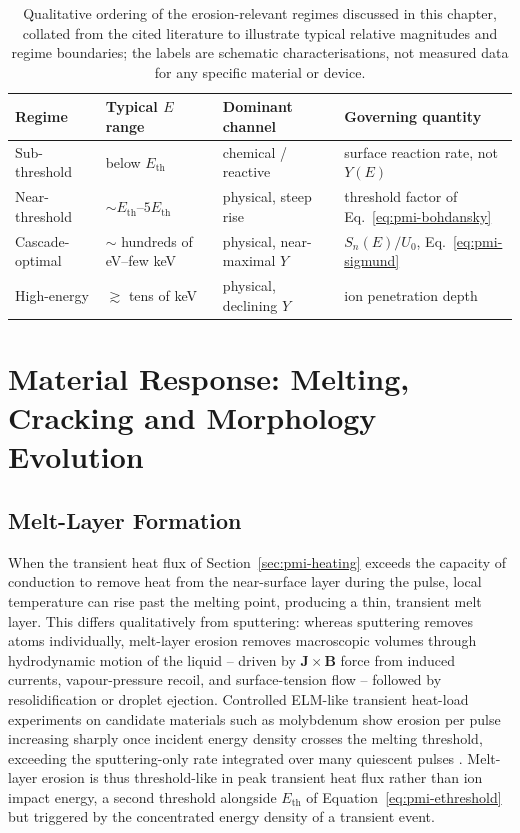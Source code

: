 \begin{table}[htbp]
\centering
\caption{Qualitative ordering of the erosion-relevant regimes discussed in this chapter, collated from the cited literature to illustrate typical relative magnitudes and regime boundaries; the labels are schematic characterisations, not measured data for any specific material or device.}
\label{tab:pmi-regimes}
\begin{tabularx}{\linewidth}{@{}l l l X@{}}
\toprule
Regime & Typical $E$ range & Dominant channel & Governing quantity \\
\midrule
Sub-threshold & below $E_{\mathrm{th}}$ & chemical / reactive & surface reaction rate, not $Y(E)$ \\
Near-threshold & $\sim E_{\mathrm{th}}$--$5E_{\mathrm{th}}$ & physical, steep rise & threshold factor of Eq.~\eqref{eq:pmi-bohdansky} \\
Cascade-optimal & $\sim$ hundreds of eV--few keV & physical, near-maximal $Y$ & $S_n(E)/U_0$, Eq.~\eqref{eq:pmi-sigmund} \\
High-energy & $\gtrsim$ tens of keV & physical, declining $Y$ & ion penetration depth \\
\bottomrule
\end{tabularx}
\end{table}

\section{Material Response: Melting, Cracking and Morphology Evolution}
\label{sec:pmi-material-response}

\subsection{Melt-Layer Formation}

When the transient heat flux of Section~\ref{sec:pmi-heating} exceeds the capacity of conduction to remove heat from the near-surface layer during the pulse, local temperature can rise past the melting point, producing a thin, transient melt layer. This differs qualitatively from sputtering: whereas sputtering removes atoms individually, melt-layer erosion removes macroscopic volumes through hydrodynamic motion of the liquid -- driven by $\mathbf{J}\times\mathbf{B}$ force from induced currents, vapour-pressure recoil, and surface-tension flow -- followed by resolidification or droplet ejection. Controlled ELM-like transient heat-load experiments on candidate materials such as molybdenum show erosion per pulse increasing sharply once incident energy density crosses the melting threshold, exceeding the sputtering-only rate integrated over many quiescent pulses \cite{ref0586}. Melt-layer erosion is thus threshold-like in peak transient heat flux rather than ion impact energy, a second threshold alongside $E_{\mathrm{th}}$ of Equation~\eqref{eq:pmi-ethreshold} but triggered by the concentrated energy density of a transient event.

